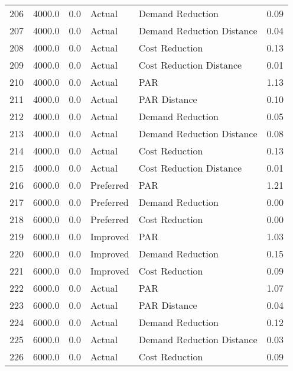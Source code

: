 \begin{longtable}{lrrllr}
206  &       4000.0 &     0.0 &         Actual &           Demand Reduction &   0.09 \\
207  &       4000.0 &     0.0 &         Actual &  Demand Reduction Distance &   0.04 \\
208  &       4000.0 &     0.0 &         Actual &             Cost Reduction &   0.13 \\
209  &       4000.0 &     0.0 &         Actual &    Cost Reduction Distance &   0.01 \\
210  &       4000.0 &     0.0 &         Actual &                        PAR &   1.13 \\
211  &       4000.0 &     0.0 &         Actual &               PAR Distance &   0.10 \\
212  &       4000.0 &     0.0 &         Actual &           Demand Reduction &   0.05 \\
213  &       4000.0 &     0.0 &         Actual &  Demand Reduction Distance &   0.08 \\
214  &       4000.0 &     0.0 &         Actual &             Cost Reduction &   0.13 \\
215  &       4000.0 &     0.0 &         Actual &    Cost Reduction Distance &   0.01 \\
216  &       6000.0 &     0.0 &      Preferred &                        PAR &   1.21 \\
217  &       6000.0 &     0.0 &      Preferred &           Demand Reduction &   0.00 \\
218  &       6000.0 &     0.0 &      Preferred &             Cost Reduction &   0.00 \\
219  &       6000.0 &     0.0 &       Improved &                        PAR &   1.03 \\
220  &       6000.0 &     0.0 &       Improved &           Demand Reduction &   0.15 \\
221  &       6000.0 &     0.0 &       Improved &             Cost Reduction &   0.09 \\
222  &       6000.0 &     0.0 &         Actual &                        PAR &   1.07 \\
223  &       6000.0 &     0.0 &         Actual &               PAR Distance &   0.04 \\
224  &       6000.0 &     0.0 &         Actual &           Demand Reduction &   0.12 \\
225  &       6000.0 &     0.0 &         Actual &  Demand Reduction Distance &   0.03 \\
226  &       6000.0 &     0.0 &         Actual &             Cost Reduction &   0.09 \\

\end{longtable}
